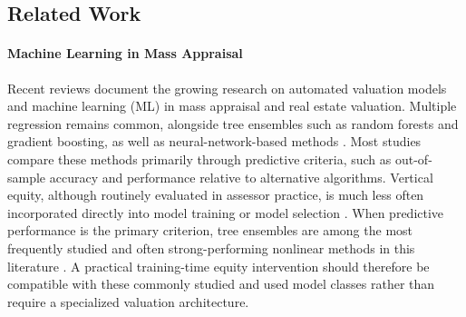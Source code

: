 \documentclass[10pt]{article}
\theoremstyle{definition}
\newcommand{\1}{\mathbf{1}}
\begin{document}







\subsection{Related Work}
\label{subsec:related_work}

\paragraph{Machine Learning in Mass Appraisal}
Recent reviews document the {growing research on} automated valuation models and machine learning (ML) in mass appraisal and {real estate} valuation. {Multiple regression remains common, alongside tree ensembles such as random forests and gradient boosting, as well as neural-network-based methods} \cite{WangLi2019,Rootetal2023,Zilli2024,purdueAssessingTechniques}. Most studies compare these methods primarily through predictive criteria, such as out-of-sample accuracy and performance relative to alternative algorithms. {Vertical equity, although routinely evaluated in assessor practice, is much less often incorporated directly into model training or model selection} \cite{WangLi2019,Rootetal2023,Zilli2024}. {When predictive performance is the primary criterion, tree ensembles are among the most frequently studied and often strong-performing nonlinear methods in this literature} \cite{Rootetal2023,Sevgen2024100111,Zilli2024}. {A practical training-time equity intervention should therefore be compatible with these commonly studied and used model classes rather than require a specialized valuation architecture.}
\end{document}
